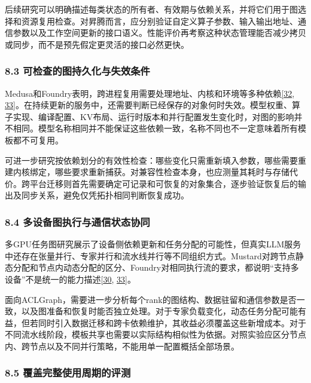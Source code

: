\documentclass[UTF8,11pt,fontset=windows]{ctexart}
\begin{document}
后续研究可以明确描述每类状态的所有者、有效期与依赖关系，并将它们用于图选择和资源复用检查。对昇腾而言，应分别验证自定义算子参数、输入输出地址、通信参数以及工作空间更新的接口语义。性能评价再考察这种状态管理能否减少拷贝或同步，而不是预先假定更灵活的接口必然更快。

\hypertarget{section-8-3}{%
\subsubsection{\texorpdfstring{\textbf{8.3 可检查的图持久化与失效条件}}{8.3 可检查的图持久化与失效条件}}\label{section-8-3}}

Medusa和Foundry表明，跨进程复用需要处理地址、内核和环境等多种依赖\protect\hyperlink{ref-32}{{[}32}, \protect\hyperlink{ref-33}{33{]}}。在持续更新的服务中，还需要判断已经保存的对象何时失效。模型权重、算子实现、编译配置、KV布局、运行时版本和并行配置发生变化时，对图的影响并不相同。模型名称相同并不能保证这些依赖一致，名称不同也不一定意味着所有模板都不可复用。

可进一步研究按依赖划分的有效性检查：哪些变化只需重新填入参数，哪些需要重建内核绑定，哪些要求重新捕获。对兼容性检查本身，也应测量其耗时与存储代价。跨平台迁移则首先需要确定可记录和可恢复的对象集合，逐步验证恢复后的输出及同步关系，避免仅凭拓扑相同判断恢复成功。

\hypertarget{section-8-4}{%
\subsubsection{\texorpdfstring{\textbf{8.4 多设备图执行与通信状态协同}}{8.4 多设备图执行与通信状态协同}}\label{section-8-4}}

多GPU任务图研究展示了设备侧依赖更新和任务分配的可能性，但真实LLM服务中还存在张量并行、专家并行和流水线并行等不同组织方式。Mustard对跨节点静态分配和节点内动态分配的区分、Foundry对相同执行流的要求，都说明``支持多设备''不是统一的能力描述\protect\hyperlink{ref-30}{{[}30}, \protect\hyperlink{ref-33}{33{]}}。

面向ACLGraph，需要进一步分析每个rank的图结构、数据驻留和通信参数是否一致，以及图准备和恢复时能否独立处理。对于专家负载变化，动态任务分配可能有益，但若同时引入数据迁移和跨卡依赖维护，其收益必须覆盖这些新增成本。对于不同流水线阶段，模板共享也需要以实际结构相似性为依据。对照实验应区分节点内、跨节点以及不同并行策略，不能用单一配置概括全部场景。

\hypertarget{section-8-5}{%
\subsubsection{\texorpdfstring{\textbf{8.5 覆盖完整使用周期的评测}}{8.5 覆盖完整使用周期的评测}}\label{section-8-5}}
\end{document}
